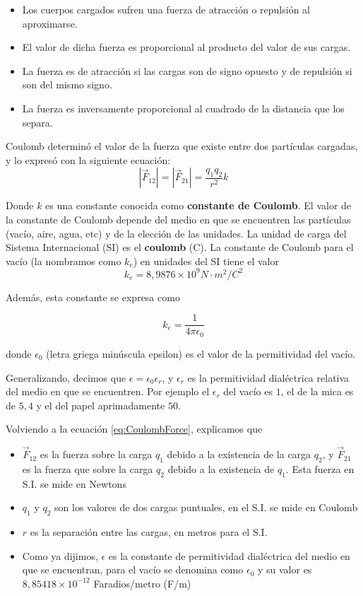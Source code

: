\documentclass{article}
\begin{document}
\begin{itemize}
\item Los cuerpos cargados sufren una fuerza de atracción o repulsión al aproximarse.
\item El valor de dicha fuerza es proporcional al producto del valor de sus cargas.
\item La fuerza es de atracción si las cargas son de signo opuesto y de repulsión si son del mismo signo.
\item La fuerza es inversamente proporcional al cuadrado de la distancia que los separa.
\end{itemize}

Coulomb determinó el valor de la fuerza que existe entre dos partículas cargadas, y lo expresó con la siguiente ecuación:
\begin{equation}
|\vec{F}_{12}| = |\vec{F}_{21}| = \frac{q_1q_2}{r^2}k
\label{eq:CoulombForce}
\end{equation}

Donde $k$ es una constante conocida como \textbf{constante de Coulomb}. El valor de la constante de Coulomb depende del medio en que se encuentren las partículas (vacío, aire, agua, etc) y de la elección de las unidades. La unidad de carga del Sistema Internacional (SI) es el \textbf{coulomb} (C). La constante de Coulomb para el vacío (la nombramos como $k_e$) en unidades del SI tiene el valor
$$k_e = 8,9876 \times 10^9 N \cdot m^2/C^2$$

Además, esta constante se expresa como

$$k_e = \frac{1}{4\pi\epsilon_0} $$ 

donde $\epsilon_0$ (letra griega minúscula epsilon) es el valor de la permitividad del vacío.

Generalizando, decimos que $\epsilon = \epsilon_0\epsilon_r$, y $\epsilon_r$ es la permitividad dialéctrica relativa del medio en que se encuentren. Por ejemplo el $\epsilon_r$ del vacío es $1$, el de la mica es de $5,4$ y el del papel aprimadamente $50$. 

Volviendo a la ecuación \ref{eq:CoulombForce}, explicamos que 

\begin{itemize}
\item $\vec{F}_{12}$ es la fuerza sobre la carga $q_1$ debido a la existencia de la carga $q_2$, y $\vec{F}_{21}$ es la fuerza que  sobre la carga $q_2$ debido a la existencia de $q_1$. Esta fuerza en S.I. se mide en Newtons
\item $q_1$ y $q_2$ son los valores de dos cargas puntuales, en el S.I. se mide en Coulomb
\item $r$ es la separación entre las cargas, en metros para el S.I.
\item Como ya dijimos, $\epsilon$ es la constante de permitividad dialéctrica del medio en que se encuentran, para el vacío se denomina como $\epsilon_0$ y su valor es $8,85418 \times 10^{-12}$ Faradios/metro (F/m)
\end{itemize}
\end{document}
